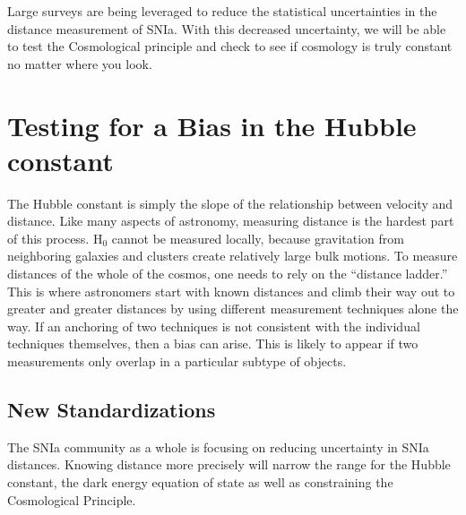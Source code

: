 \documentclass[apj, iop]{emulateapj}
\newcommand{\sn}{SNIa}
\newcommand{\Hubble}{\ensuremath{\text{H}_0}}
\begin{document}

Large surveys are being leveraged to reduce the statistical uncertainties in the
distance measurement of \sn{}. With this decreased uncertainty, we will be able
to test the Cosmological principle and check to see if cosmology is truly
constant no matter where you look.

\section{Testing for a Bias in the Hubble constant} %
\label{sec:Hubble_Bias}

The Hubble constant is simply the slope of the relationship between velocity and
distance. Like many aspects of astronomy, measuring distance is the hardest part
of this process. \Hubble{} cannot be measured locally, because gravitation from
neighboring galaxies and clusters create relatively large bulk motions. To
measure distances of the whole of the cosmos, one needs to rely on the
``distance ladder.''  This is where astronomers start with known distances and
climb their way out to greater and greater distances by using different
measurement techniques alone the way. If an anchoring of two techniques is not
consistent with the individual techniques themselves, then a bias can arise.
This is likely to appear if two measurements only overlap in a particular
subtype of objects.

\subsection{New Standardizations}\label{new-standardizations}

The \sn{} community as a whole is focusing on reducing uncertainty in \sn{}
distances. Knowing distance more precisely will narrow the range for the Hubble
constant, the dark energy equation of state as well as constraining the
Cosmological Principle.
\end{document}
